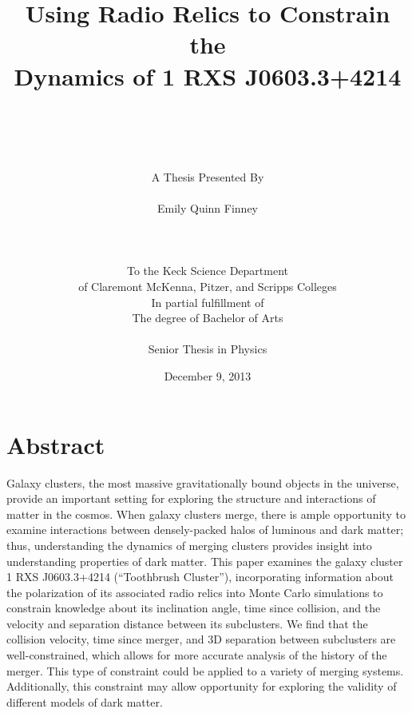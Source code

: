 \documentclass[12 pt]{article}
\begin{document}
\title{Using Radio Relics to Constrain the  \\ Dynamics of 1 RXS J0603.3+4214 \\ \\ \\}

\author{A Thesis Presented By \\ \\
Emily Quinn Finney \\ \\ \\ \\
To the Keck Science Department \\
of Claremont McKenna, Pitzer, and Scripps Colleges \\
In partial fulfillment of \\
The degree of Bachelor of Arts \\ \\
Senior Thesis in Physics \\}

\date{December 9, 2013}

\maketitle

\newpage

\section*{Abstract}

Galaxy clusters, the most massive gravitationally bound objects in the universe, provide an important setting for exploring the structure and interactions of matter in the cosmos. When galaxy clusters merge, there is ample opportunity to examine interactions between densely-packed halos of luminous and dark matter; thus, understanding the dynamics of merging clusters provides insight into understanding  properties of dark matter. This paper examines the galaxy cluster 1 RXS J0603.3+4214 (“Toothbrush Cluster”), incorporating information about the polarization of its associated radio relics into Monte Carlo simulations to constrain knowledge about its inclination angle, time since collision, and the velocity and separation distance between its subclusters. We find that the collision velocity, time since merger, and 3D separation between subclusters are well-constrained, which allows for more accurate analysis of the history of the merger. This type of constraint could be applied to a variety of merging systems. Additionally, this constraint may allow opportunity for exploring the validity of different models of dark matter.
\end{document}
